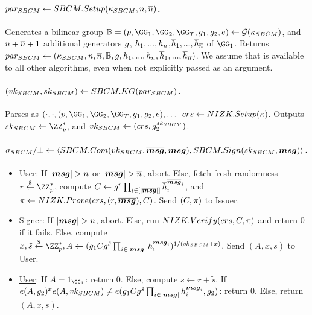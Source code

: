 \paragraph{$par_{SBCM} \gets SBCM.Setup(\kappa_{SBCM},n,\overline{n})$.} %
Generates a bilinear group $\BB = (p,\GG_1,\GG_2,\GG_T,\gen{g}_1,\gen{g}_2,e)
\gets \PGen(\SBCMsecpar)$, and $n+\overline{n}+1$ additional generators
$g$, $h_1,...,h_{n}$,$\overline{h}_1,...,\overline{h}_{\overline{n}}$
of $\GG_1$. Returns $par_{SBCM} \gets (\kappa_{SBCM},n,\overline{n},\mathbb{B},
g,h_1,...,h_{n},\overline{h}_1,...,\overline{h}_{\overline{n}})$.
We assume that \SBCMparm is available to all other algorithms, even when not
explicitly passed as an argument.

\paragraph{$(vk_{SBCM},sk_{SBCM}) \gets SBCM.KG(par_{SBCM})$.} %
Parses \SBCMparm as $(\cdot,\cdot,(p,\GG_1,\GG_2,\GG_T,\gen{g}_1,\gen{g}_2,e),
\dots$ $crs \gets NIZK.Setup(\kappa)$. Outputs $\SBCMsk \gets \ZZ^*_p$,
and $vk_{SBCM} \gets (crs,g_2^{sk_{SBCM}})$.

\paragraph{$\sigma_{SBCM}/\bot \gets \langle SBCM.Com(vk_{SBCM},\overline{\boldsymbol{msg}},
  \boldsymbol{msg}), SBCM.Sign(sk_{SBCM},\boldsymbol{msg}) \rangle$.} %

\begin{itemize}
\item \underline{User}: If $|\smsg|>\nattrs$ or $|\overline{\smsg}|>\tnattrs$,
  abort. Else, fetch fresh randomness $r \getr \ZZ^*_p$, compute $C \gets
  g^r\prod_{i \in [|\overline{\boldsymbol{msg}}|]}\overline{h}_i^{\overline{\boldsymbol{msg}}_i}$,
  and $\pi \gets NIZK.Prove(crs,(r,\overline{\boldsymbol{msg}}),C)$.
  Send $(C,\pi)$ to Issuer.
\item \underline{Signer}: If $|\smsg|>\nattrs$, abort. Else, run $NIZK.Verify
  (crs,C,\pi)$ and return $0$ if it fails. Else, compute
  $x,\tilde{s} \getr \ZZ^*_p, A \gets (\gen{g}_1\Ccom \gen{g}^{\tilde{s}}
  \prod_{i \in |\smsg|}\gen{h}_i^{\smsg_i})^{1/(\SBCMsk+x)}$. Send
  $(A,x,\tilde{s})$ to User.
\item \underline{User}: If $A = 1_{\GG_1}$: return $0$. Else, compute
  $s \gets r + \tilde{s}$. If $e(A,g_2)^xe(A,vk_{SBCM}) \neq
  e(g_1Cg^{\tilde{s}}\prod_{i \in |\boldsymbol{msg}|}h_i^{\boldsymbol{msg}_i},
  g_2)$: return $0$. Else, return $(A,x,s)$.
\end{itemize}

